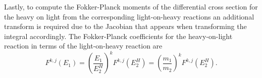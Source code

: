 \documentclass[../main.tex]{subfiles}
\begin{document}
Lastly, to compute the Fokker-Planck moments of the differential cross section for the heavy on light from the corresponding light-on-heavy reactions an additional transform is required due to the Jacobian that appears when transforming the integral accordingly. The Fokker-Planck coefficients for the heavy-on-light reaction in terms of the light-on-heavy reaction are
\begin{equation}
  F^{k,j}(E_1) = \left(\dfrac{E_1}{E_2^H}\right)^k F^{k,j}(E_2^H) = \left(\dfrac{m_1}{m_2}\right)^k F^{k,j}(E_2^H).
\end{equation}
\end{document}
